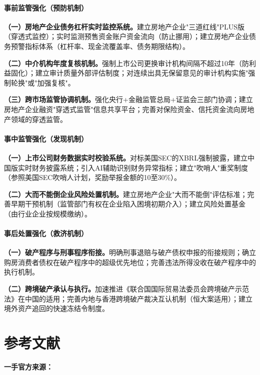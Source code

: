 \documentclass[11pt,a4paper,oneside,openany]{article}
\begin{document}
\subsection{事前监管强化（预防机制）}
\textbf{（一）房地产企业债务杠杆实时监控系统。}建立房地产企业"三道红线"PLUS版（穿透式监控）；实时监测预售资金账户资金流向（防止挪用）；建立房地产企业债务预警指标体系（杠杆率、现金流覆盖率、债务期限结构）。

\textbf{（二）中介机构年度复核机制。}强制上市公司更换审计机构间隔不超过10年（防利益固化）；建立审计质量外部评估制度；对连续出具无保留意见的审计机构实施"强制轮换"或"加强复核"。

\textbf{（三）跨市场监管协调机制。}强化央行+金融监管总局+证监会三部门协调；建立房地产企业融资"穿透式监管"信息共享平台；完善对保险资金、信托资金流向房地产领域的穿透监管。

\subsection{事中监管强化（发现机制）}
\textbf{（一）上市公司财务数据实时校验系统。}对标美国SEC的XBRL强制披露，建立中国版实时财务披露系统；引入AI辅助识别财务异常指标；建立"吹哨人"重奖制度（参照美国SEC吹哨人计划，奖励举报金额的10至30\%）。

\textbf{（二）大而不能倒企业风险处置机制。}建立房地产企业"大而不能倒"评估标准；完善早期干预机制（监管部门有权在企业陷入困境初期介入）；建立风险处置基金（由行业企业按规模缴纳）。

\subsection{事后处置强化（救济机制）}
\textbf{（一）破产程序与刑事程序衔接。}明确刑事退赔与破产债权申报的衔接规则；确立购房消费者债权在破产程序中的超级优先地位；完善违法所得没收在破产程序中的执行机制。

\textbf{（二）跨境破产承认与执行。}加速推进《联合国国际贸易法委员会跨境破产示范法》在中国的适用；完善内地与香港跨境破产裁决互认机制（恒大案适用）；建立境外资产追回的快速冻结令制度。

\newpage
\part{参考文献}
\textbf{一手官方来源：}

\small
\end{document}
